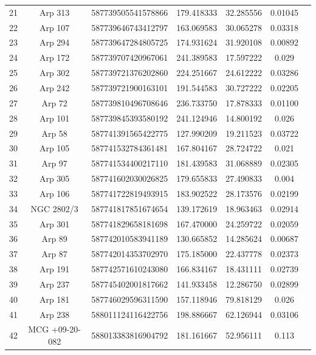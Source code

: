 \begin{table}
{\begin{tabular}{|c|c|c|c|c|c|c|}
         21 & Arp 313 & 587739505541578866 & 179.418333 & 32.285556 & 0.01045 \\
         22 & Arp 107 & 587739646743412797 & 163.069583 & 30.065278 & 0.03318 \\
         23 & Arp 294 & 587739647284805725 & 174.931624 & 31.920108 & 0.00892 \\
         24 & Arp 172 & 587739707420967061 & 241.389583 & 17.597222 & 0.029 \\
         25 & Arp 302 & 587739721376202860 & 224.251667 & 24.612222 & 0.03286 \\
         26 & Arp 242 & 587739721900163101 & 191.544583 & 30.727222 & 0.02205 \\
         27 & Arp 72 & 587739810496708646 & 236.733750 & 17.878333 & 0.01100 \\
         28 & Arp 101 & 587739845393580192 & 241.124946 & 14.800192 & 0.026 \\
         29 & Arp 58 & 587741391565422775 & 127.990209 & 19.211523 & 0.03722 \\
         30 & Arp 105 & 587741532784361481 & 167.804167 & 28.724722 & 0.021 \\
         31 & Arp 97 & 587741534400217110 & 181.439583 & 31.068889 & 0.02305 \\
         32 & Arp 305 & 587741602030026825 & 179.655833 & 27.490833 & 0.004 \\
         33 & Arp 106 & 587741722819493915 & 183.902522 & 28.173576 & 0.02199 \\
         34 & NGC 2802/3 & 587741817851674654 & 139.172619 & 18.963463 & 0.02914 \\
         35 & Arp 301 & 587741829658181698 & 167.470000 & 24.259722 & 0.02059 \\
         36 & Arp 89 & 587742010583941189 & 130.665852 & 14.285624 & 0.00687 \\
         37 & Arp 87 & 587742014353702970 & 175.185000 & 22.437778 & 0.02373 \\
         38 & Arp 191 & 587742571610243080 & 166.834167 & 18.431111 & 0.02739 \\
         39 & Arp 237 & 587745402001817662 & 141.933458 & 12.286750 & 0.02899 \\
         40 & Arp 181 & 587746029596311590 & 157.118946 & 79.818129 & 0.026 \\
         41 & Arp 238 & 588011124116422756 & 198.886667 & 62.126944 & 0.03106 \\
         42 & MCG +09-20-082 & 588013383816904792 & 181.161667 & 52.956111 & 0.113 \\

\end{tabular}}
\end{table}

